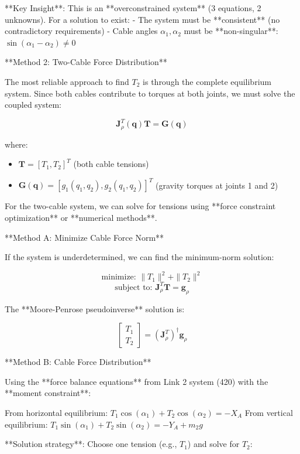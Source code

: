 **Key Insight**: This is an **overconstrained system** (3 equations, 2 unknowns). For a solution to exist:
- The system must be **consistent** (no contradictory requirements)
- Cable angles $\alpha_1, \alpha_2$ must be **non-singular**: $\sin(\alpha_1 - \alpha_2) \neq 0$

**Method 2: Two-Cable Force Distribution**

The most reliable approach to find $T_2$ is through the complete equilibrium system. Since both cables contribute to torques at both joints, we must solve the coupled system:

$$\mathbf{J}_{\rho}^T(\mathbf{q}) \mathbf{T} = \mathbf{G}(\mathbf{q})$$

where:
\begin{itemize}
    \item $\mathbf{T} = [T_1, T_2]^T$ (both cable tensions)
    \item $\mathbf{G}(\mathbf{q}) = [g_1(q_1, q_2), g_2(q_1, q_2)]^T$ (gravity torques at joints 1 and 2)
\end{itemize}

For the two-cable system, we can solve for tensions using **force constraint optimization** or **numerical methods**.

**Method A: Minimize Cable Force Norm**

If the system is underdetermined, we can find the minimum-norm solution:

$$\text{minimize: } \|T_1\|^2 + \|T_2\|^2$$
$$\text{subject to: } \mathbf{J}_{\rho}^T \mathbf{T} = \mathbf{g}_{\rho}$$

The **Moore-Penrose pseudoinverse** solution is:

\begin{equation}
\boxed{\begin{bmatrix} T_1 \\ T_2 \end{bmatrix} = (\mathbf{J}_{\rho}^T)^{\dagger} \mathbf{g}_{\rho}}
\label{eq:cable_tensions_pseudoinverse}
\end{equation}

**Method B: Cable Force Distribution**

Using the **force balance equations** from Link 2 system (420) with the **moment constraint**:

From horizontal equilibrium: $T_1 \cos(\alpha_1) + T_2 \cos(\alpha_2) = -X_A$
From vertical equilibrium: $T_1 \sin(\alpha_1) + T_2 \sin(\alpha_2) = -Y_A + m_2 g$

**Solution strategy**: Choose one tension (e.g., $T_1$) and solve for $T_2$:

